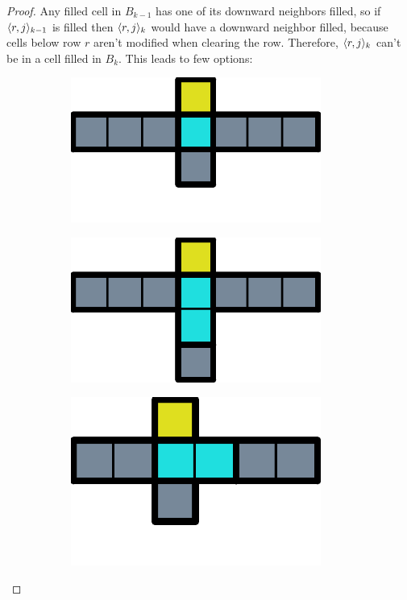 \begin{proof}
  Any filled cell in $B_{k-1}$ has one of its downward neighbors filled, so if $\cell[r]_{k-1}$ is filled then $\cell[r]_k$ would have a downward neighbor filled, because cells below row $r$ aren't modified when clearing the row. Therefore, $\cell[r]_k$ can't be in a cell filled in $B_k$. This leads to few options:

\begin{figure}[ht]
  \centering
  \begin{subfigure}[b]{0.15\textwidth}
    \centering
    \includegraphics[width=0.9\textwidth]{./pictures/dominoes/proff-floating/scenario-1.pdf}
    \caption{}
    \label{floating:a}
  \end{subfigure}
  \begin{subfigure}[b]{0.15\textwidth}
    \centering
    \includegraphics[width=0.9\textwidth]{./pictures/dominoes/proff-floating/scenario-2.pdf}
    \caption{}
    \label{floating:b}
  \end{subfigure}
  \begin{subfigure}[b]{0.15\textwidth}
    \centering
    \includegraphics[width=0.9\textwidth]{./pictures/dominoes/proff-floating/scenario-3.pdf}

\end{subfigure}
\end{figure}
\end{proof}
